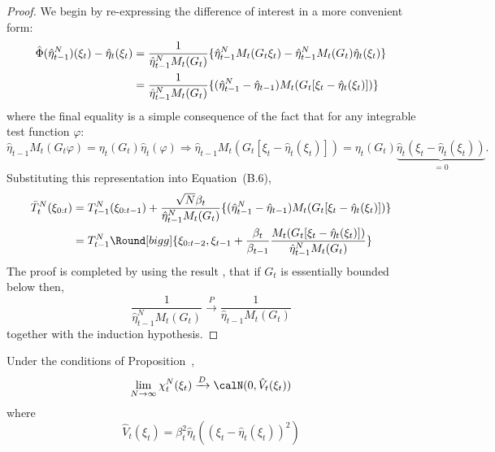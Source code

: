 \begin{proof}
  We begin by re-expressing the difference of interest in a more convenient form:
  \begin{align}
    \hat\Phi(\hat\eta_{t-1}^N)(\xi_t) - \hat\eta_t(\xi_t)
    &= \frac{1}{\hat\eta_{t-1}^NM_t(G_t)}\{
    \hat\eta_{t-1}^NM_t(G_t\xi_t) -
    \hat\eta_{t-1}^NM_t(G_t)\hat\eta_t(\xi_t)\} \notag\\
    &= \frac{1}{\hat\eta_{t-1}^NM_t(G_t)}
    \{(\hat\eta_{t-1}^N-\hat\eta_{t-1})M_t(G_t[\xi_t-\hat\eta_t(\xi_t)])\}
  \end{align}
  where the final equality is a simple consequence of the fact that for any
  integrable test function $\varphi$:
  \begin{equation*}
    \hat\eta_{t-1} M_t (G_t \varphi) = \eta_t(G_t) \hat\eta_t(\varphi)
    \Rightarrow
    \hat\eta_{t-1} M_t (G_t [\xi_t - \hat\eta_t(\xi_t)]) = \eta_t(G_t)
    \underset{=0}{\underbrace{\hat\eta_t(\xi_t - \hat\eta_t(\xi_t))}} .
  \end{equation*}
  Substituting this representation into Equation~{\allcapt (B.6)},
  \begin{align}
    \bar{T}_t^N(\xi_{0:t})
    &= T_{t-1}^N(\xi_{0:t-1}) +
    \frac{\sqrt{N}\beta_t}{\hat\eta_{t-1}^NM_t(G_t)}
    \{(\hat\eta_{t-1}^N-\hat\eta_{t-1})M_t(G_t[\xi_t-\hat\eta_t(\xi_t)])\}
    \notag\\
    &= T_{t-1}^N\Round[bigg]{\xi_{0:t-2},
      \xi_{t-1} + \frac{\beta_t}{\beta_{t-1}}
      \frac{M_t(G_t[\xi_t-\hat\eta_t(\xi_t)])}{\hat\eta_{t-1}^NM_t(G_t)}}
  \end{align}
  The proof is completed by using the result
  \cite[][sec.~7.4.3]{DelMoral:2004ux}, that if $G_t$ is essentially bounded
  below then,
  \begin{equation*}
    \frac{1}{\hat\eta_{t-1}^NM_t(G_t)} \xrightarrow{P}
    \frac{1}{\hat\eta_{t-1}M_t(G_t)}
  \end{equation*}
  together with the induction hypothesis.
\end{proof}

\begin{lemma}\label{lem:sampling}
  Under the conditions of Proposition~,
  \begin{equation}
    \lim_{N\to\infty}\chi_t^N(\xi_t)\xrightarrow{D}\calN(0, \hat{V}_t(\xi_t))
  \end{equation}
  where
  \begin{equation}
    \hat{V}_t(\xi_t) = \beta_t^2\hat\eta_t((\xi_t - \hat\eta_t(\xi_t))^2)
  \end{equation}
\end{lemma}

